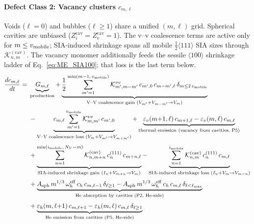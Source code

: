 \paragraph{Defect Class 2: Vacancy clusters $c_{m,\ell}$}
\label{sec:ME_vac}
Voids ($\ell=0$) and bubbles ($\ell\geq 1$) share a unified $(m,\ell)$ grid.
Spherical cavities are unbiased ($Z_i^{\mathrm{cav}}=Z_v^{\mathrm{cav}}=1$). The
v--v coalescence terms are active only for $m\leq v_{\rm mobile}$; SIA-induced
shrinkage spans all mobile $\tfrac12\langle111\rangle$ SIA sizes through
$\mathcal{K}^{(\mathrm{cav})}_{n,m}$. The vacancy monomer additionally feeds the
sessile $\langle100\rangle$ shrinkage ladder of Eq.~\eqref{eq:ME_SIA100}; that
loss is the last term below.
\begin{equation}\label{eq:ME_vac}
\begin{split}
\frac{dc_{m,\ell}}{dt} = {} &
  \underbrace{G_{m,\ell}}_{\text{production}}
  + \underbrace{
     \frac{1}{2}\sum_{m'=1}^{\min(m-1,\,v_{\rm mobile})}
     \mathcal{K}_{m',m-m'}^{vv}\,c_{m',0}\,c_{m-m',\ell}\,
     \delta_{m \leq 2\,v_{\rm mobile}}
     }_{\text{V--V coalescence gain } (V_{m'}+V_{m-m'}\to V_m)}
  \\[2pt]
  &- \underbrace{
     c_{m,\ell}\sum_{m'=1}^{v_{\rm mobile}}
     \mathcal{K}_{m,m'}^{vv}\,c_{m',0}
     }_{\text{V--V coalescence loss } (V_m+V_{m'}\to V_{m+m'})}
  + \underbrace{
     \varepsilon_v(m{+}1,\ell)\,c_{m+1,\ell}
   - \varepsilon_v(m,\ell)\,c_{m,\ell}
     }_{\text{thermal emission (vacancy from cavities, P5)}}
  \\[2pt]
  &+ \underbrace{
     \sum_{n=1}^{\min(i_{\rm mobile},\,N_V-m)}
     \mathcal{K}_{n,m+n}^{(\mathrm{cav})}\,c^{(111)}_n\,c_{m+n,\ell}
     }_{\text{SIA-induced shrinkage gain } (I_n + V_{m+n}\to V_m)}
  - \underbrace{
     \sum_{n=1}^{i_{\rm mobile}}
     \mathcal{K}_{n,m}^{(\mathrm{cav})}\,c^{(111)}_n\,c_{m,\ell}
     }_{\text{SIA-induced shrinkage loss } (I_n + V_m\to V_{m-n})}
  \\[2pt]
  &+ \underbrace{
     A_{\mathrm{sph}}\,m^{1/3}\,\omega_h^{\mathrm{eff}}\,
     c_h\,c_{m,\ell-1}\,\delta_{\ell \geq 1}
   - A_{\mathrm{sph}}\,m^{1/3}\,\omega_h^{\mathrm{eff}}\,
     c_h\,c_{m,\ell}\,\delta_{\ell < \ell_{\max}}
     }_{\text{He absorption by cavities (P2, He-side)}}
  \\[2pt]
  &+ \underbrace{
     \varepsilon_h(m,\ell{+}1)\,c_{m,\ell+1}
   - \varepsilon_h(m,\ell)\,c_{m,\ell}\,\delta_{\ell \geq 1}
     }_{\text{He emission from cavities (P5, He-side)}}

\end{split}
\end{equation}
